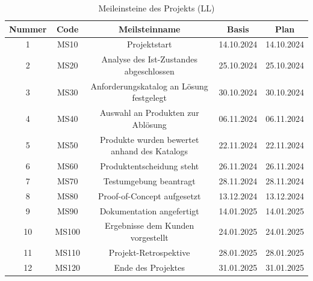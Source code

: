 \documentclass[ThesisDJ.tex]{subfiles}
\begin{document}
\begin{table}[h]
  \centering
\begin{tabular}{|c|c|c|c|c|}
  \hline
  Nummer & Code & Meilsteinname & Basis & Plan \\
  \hline
  1 & MS10 & Projektstart & 14.10.2024 & 14.10.2024 \\
  \hline
  2 & MS20 & Analyse des Ist-Zustandes abgeschlossen & 25.10.2024 & 25.10.2024 \\
  \hline
  3 & MS30 & Anforderungskatalog an Lösung festgelegt & 30.10.2024 & 30.10.2024 \\
  \hline
  4 & MS40 & Auswahl an Produkten zur Ablösung & 06.11.2024 & 06.11.2024 \\
  \hline
  5 & MS50 & Produkte wurden bewertet anhand des Katalogs & 22.11.2024 & 22.11.2024 \\
  \hline
  6 & MS60 & Produktentscheidung steht & 26.11.2024 & 26.11.2024 \\
  \hline
  7 & MS70 & Testumgebung beantragt & 28.11.2024 & 28.11.2024 \\
  \hline
  8 & MS80 & Proof-of-Concept aufgesetzt & 13.12.2024 & 13.12.2024 \\
  \hline
  9 & MS90 & Dokumentation angefertigt & 14.01.2025 & 14.01.2025 \\
  \hline
  10 & MS100 & Ergebnisse dem Kunden vorgestellt & 24.01.2025 & 24.01.2025 \\
  \hline
  11 & MS110 & Projekt-Retrospektive & 28.01.2025 & 28.01.2025 \\
  \hline
  12 & MS120 & Ende des Projektes & 31.01.2025 & 31.01.2025 \\
  \hline
\end{tabular}

  \caption{Meileinsteine des Projekts (LL)}
\label{tab:milestones}

\end{table}
\end{document}
